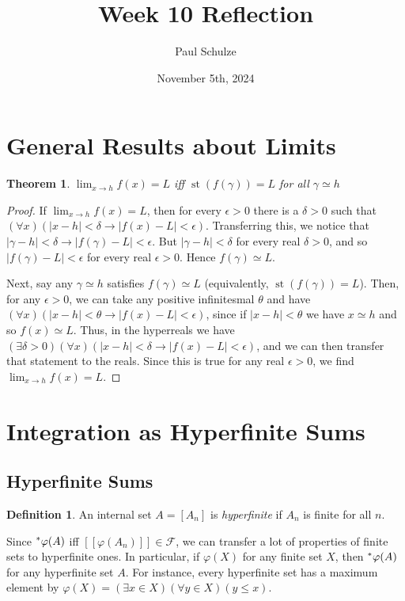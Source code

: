 \documentclass{article}
\title{Week 10 Reflection}
\author{Paul Schulze}
\date{November 5th, 2024}
\newcommand{\hr}[1]{\prescript{*}{}{#1}}
\DeclareMathOperator{\st}{st}
\newtheorem*{thm}{Theorem}
\theoremstyle{definition}
\newtheorem*{defn}{Definition}
\begin{document}
\maketitle

\section{General Results about Limits}
\begin{thm}
    $\lim_{x \to h} f(x) = L$ iff $\st(f(\gamma)) = L$ for all $\gamma \simeq h$
\end{thm}
\begin{proof}
    If $\lim_{x \to h} f(x) = L$, then for every $\epsilon > 0$ there is a $\delta > 0$ such that $(\forall x)(|x - h| < \delta \to |f(x) - L| < \epsilon)$. Transferring this, we notice that $|\gamma - h| < \delta \to |f(\gamma) - L| < \epsilon$. But $|\gamma - h| < \delta$ for every real $\delta > 0$, and so $|f(\gamma) - L| < \epsilon$ for every real $\epsilon > 0$. Hence $f(\gamma) \simeq L$.

    Next, say any $\gamma \simeq h$ satisfies $f(\gamma) \simeq L$ (equivalently, $\st(f(\gamma)) = L$). Then, for any $\epsilon > 0$, we can take any positive infinitesmal $\theta$ and have $(\forall x)(|x - h| < \theta \to |f(x) - L| < \epsilon)$, since if $|x - h| < \theta$ we have $x \simeq h$ and so $f(x) \simeq L$. Thus, in the hyperreals we have $(\exists \delta > 0)(\forall x)(|x - h| < \delta \to |f(x) - L| < \epsilon)$, and we can then transfer that statement to the reals. Since this is true for any real $\epsilon > 0$, we find $\lim_{x \to h} f(x) = L$.
\end{proof}

\section{Integration as Hyperfinite Sums}
\subsection{Hyperfinite Sums}

\begin{defn}
    An internal set $A = [A_n]$ is \textit{hyperfinite} if $A_n$ is finite for all $n$.
\end{defn}

Since $\hr{\varphi}(A)$ iff $[[\varphi(A_n)]] \in \mathcal{F}$, we can transfer a lot of properties of finite sets to hyperfinite ones. In particular, if $\varphi(X)$ for any finite set $X$, then $\hr{\varphi}(A)$ for any hyperfinite set $A$. For instance, every hyperfinite set has a maximum element by $\varphi(X) = (\exists x \in X)(\forall y \in X)(y \leq x)$.
\end{document}
